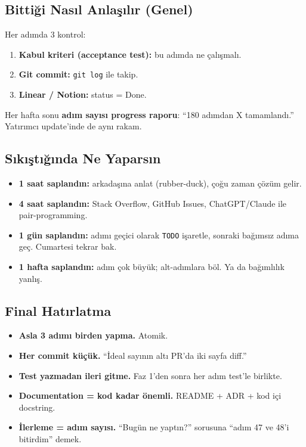 \documentclass[11pt,a4paper]{article}
\begin{document}
\subsection{Bittiği Nasıl Anlaşılır (Genel)}

Her adımda 3 kontrol:
\begin{enumerate}
    \item \textbf{Kabul kriteri (acceptance test):} bu adımda ne çalışmalı.
    \item \textbf{Git commit:} \texttt{git log} ile takip.
    \item \textbf{Linear / Notion:} status = Done.
\end{enumerate}

Her hafta sonu \textbf{adım sayısı progress raporu}: ``180 adımdan X tamamlandı.'' Yatırımcı update'inde de aynı rakam.

\subsection{Sıkıştığında Ne Yaparsın}

\begin{itemize}
    \item \textbf{1 saat saplandın:} arkadaşına anlat (rubber-duck), çoğu zaman çözüm gelir.
    \item \textbf{4 saat saplandın:} Stack Overflow, GitHub Issues, ChatGPT/Claude ile pair-programming.
    \item \textbf{1 gün saplandın:} adımı geçici olarak \texttt{TODO} işaretle, sonraki bağımsız adıma geç. Cumartesi tekrar bak.
    \item \textbf{1 hafta saplandın:} adım çok büyük; alt-adımlara böl. Ya da bağımlılık yanlış.
\end{itemize}

\subsection{Final Hatırlatma}

\begin{itemize}
    \item \textbf{Asla 3 adımı birden yapma.} Atomik.
    \item \textbf{Her commit küçük.} ``İdeal sayının altı PR'da iki sayfa diff.''
    \item \textbf{Test yazmadan ileri gitme.} Faz 1'den sonra her adım test'le birlikte.
    \item \textbf{Documentation = kod kadar önemli.} README + ADR + kod içi docstring.
    \item \textbf{İlerleme = adım sayısı.} ``Bugün ne yaptın?'' sorusuna ``adım 47 ve 48'i bitirdim'' demek.
\end{itemize}
\end{document}
